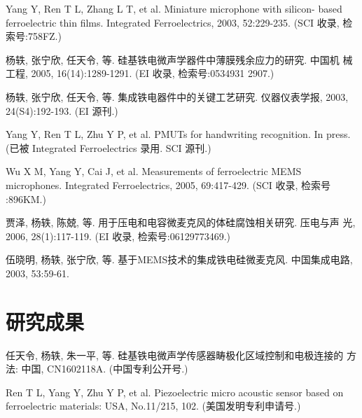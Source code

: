 \begin{resume}
  \begin{enumerate}[label={[\arabic*]}]
  \addtolength{\itemsep}{-.36\baselineskip}%
  \item Yang Y, Ren T L, Zhang L T, et al. Miniature microphone with silicon-
    based ferroelectric thin films. Integrated Ferroelectrics, 2003,
    52:229-235. (SCI 收录, 检索号:758FZ.)
  \item 杨轶, 张宁欣, 任天令, 等. 硅基铁电微声学器件中薄膜残余应力的研究. 中国机
    械工程, 2005, 16(14):1289-1291. (EI 收录, 检索号:0534931 2907.)
  \item 杨轶, 张宁欣, 任天令, 等. 集成铁电器件中的关键工艺研究. 仪器仪表学报,
    2003, 24(S4):192-193. (EI 源刊.)
  \item Yang Y, Ren T L, Zhu Y P, et al. PMUTs for handwriting recognition. In
    press. (已被 Integrated Ferroelectrics 录用. SCI 源刊.)
  \item Wu X M, Yang Y, Cai J, et al. Measurements of ferroelectric MEMS
    microphones. Integrated Ferroelectrics, 2005, 69:417-429. (SCI 收录, 检索号
    :896KM.)
  \item 贾泽, 杨轶, 陈兢, 等. 用于压电和电容微麦克风的体硅腐蚀相关研究. 压电与声
    光, 2006, 28(1):117-119. (EI 收录, 检索号:06129773469.)
  \item 伍晓明, 杨轶, 张宁欣, 等. 基于MEMS技术的集成铁电硅微麦克风. 中国集成电路, 
    2003, 53:59-61.
  \end{enumerate}

  \section*{研究成果} %
  \begin{enumerate}[label=\textbf{[\arabic*]}]
  \addtolength{\itemsep}{-.36\baselineskip}%
  \item 任天令, 杨轶, 朱一平, 等. 硅基铁电微声学传感器畴极化区域控制和电极连接的
    方法: 中国, CN1602118A. (中国专利公开号.)
  \item Ren T L, Yang Y, Zhu Y P, et al. Piezoelectric micro acoustic sensor
    based on ferroelectric materials: USA, No.11/215, 102. (美国发明专利申请号.)
  \end{enumerate}
\fi
\fi
\end{resume}
